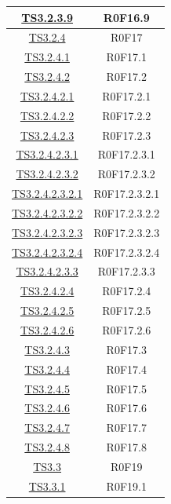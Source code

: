 \documentclass[../PianoDiQualifica.tex]{subfiles}
\begin{document}
\begin{longtable}{|c|c|}
		\hline
		\hyperlink{TS3.2.3.9}{TS3.2.3.9} & R0F16.9   \\
		\hline
		\hyperlink{TS3.2.4}{TS3.2.4} & R0F17   \\
		\hline
		\hyperlink{TS3.2.4.1}{TS3.2.4.1} & R0F17.1   \\
		\hline
		\hyperlink{TS3.2.4.2}{TS3.2.4.2} & R0F17.2   \\
		\hline
		\hyperlink{TS3.2.4.2.1}{TS3.2.4.2.1} & R0F17.2.1   \\
		\hline
		\hyperlink{TS3.2.4.2.2}{TS3.2.4.2.2} & R0F17.2.2   \\
		\hline
		\hyperlink{TS3.2.4.2.3}{TS3.2.4.2.3} & R0F17.2.3   \\
		\hline
		\hyperlink{TS3.2.4.2.3.1}{TS3.2.4.2.3.1} & R0F17.2.3.1   \\
		\hline
		\hyperlink{TS3.2.4.2.3.2}{TS3.2.4.2.3.2} & R0F17.2.3.2   \\
		\hline
		\hyperlink{TS3.2.4.2.3.2.1}{TS3.2.4.2.3.2.1} & R0F17.2.3.2.1   \\
		\hline
		\hyperlink{TS3.2.4.2.3.2.2}{TS3.2.4.2.3.2.2} & R0F17.2.3.2.2   \\
		\hline
		\hyperlink{TS3.2.4.2.3.2.3}{TS3.2.4.2.3.2.3} & R0F17.2.3.2.3   \\
		\hline
		\hyperlink{TS3.2.4.2.3.2.4}{TS3.2.4.2.3.2.4} & R0F17.2.3.2.4   \\
		\hline
		\hyperlink{TS3.2.4.2.3.3}{TS3.2.4.2.3.3} & R0F17.2.3.3   \\
		\hline
		\hyperlink{TS3.2.4.2.4}{TS3.2.4.2.4} & R0F17.2.4   \\
		\hline
		\hyperlink{TS3.2.4.2.5}{TS3.2.4.2.5} & R0F17.2.5   \\
		\hline
		\hyperlink{TS3.2.4.2.6}{TS3.2.4.2.6} & R0F17.2.6   \\
		\hline
		\hyperlink{TS3.2.4.3}{TS3.2.4.3} & R0F17.3   \\
		\hline
		\hyperlink{TS3.2.4.4}{TS3.2.4.4} & R0F17.4   \\
		\hline
		\hyperlink{TS3.2.4.5}{TS3.2.4.5} & R0F17.5   \\
		\hline
		\hyperlink{TS3.2.4.6}{TS3.2.4.6} & R0F17.6   \\
		\hline
		\hyperlink{TS3.2.4.7}{TS3.2.4.7} & R0F17.7   \\
		\hline
		\hyperlink{TS3.2.4.8}{TS3.2.4.8} & R0F17.8   \\
		\hline
		\hyperlink{TS3.3}{TS3.3} & R0F19   \\
		\hline
		\hyperlink{TS3.3.1}{TS3.3.1} & R0F19.1   \\
		\hline

\end{longtable}
\end{document}
